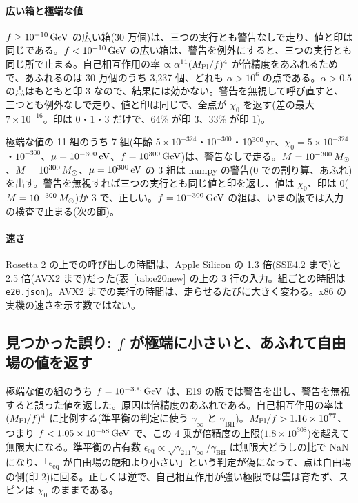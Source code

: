 \paragraph{広い箱と極端な値}
$f\ge10^{-10}\,\mathrm{GeV}$ の広い箱(30 万個)は、三つの実行とも警告なしで走り、値と印は同じである。$f<10^{-10}\,\mathrm{GeV}$ の広い箱は、警告を例外にすると、三つの実行とも同じ所で止まる。自己相互作用の率 $\propto\alpha^{11}(M_\mathrm{Pl}/f)^4$ が倍精度をあふれるためで、あふれるのは 30 万個のうち 3{,}237 個、どれも $\alpha>10^{6}$ の点である。$\alpha>0.5$ の点はもともと印 3 なので、結果には効かない。警告を無視して呼び直すと、三つとも例外なしで走り、値と印は同じで、全点が $\chi_0$ を返す(差の最大 $7\times10^{-16}$。印は 0・1・3 だけで、64\% が印 3、33\% が印 1)。

極端な値の 11 組のうち 7 組(年齢 $5\times10^{-324}$・$10^{-300}$・$10^{300}\,\mathrm{yr}$、$\chi_0=5\times10^{-324}$・$10^{-300}$、$\mu=10^{-300}\,\mathrm{eV}$、$f=10^{300}\,\mathrm{GeV}$)は、警告なしで走る。$M=10^{-300}\,M_\odot$、$M=10^{300}\,M_\odot$、$\mu=10^{300}\,\mathrm{eV}$ の 3 組は numpy の警告(0 での割り算、あふれ)を出す。警告を無視すれば三つの実行とも同じ値と印を返し、値は $\chi_0$、印は 0($M=10^{-300}\,M_\odot$)か 3 で、正しい。$f=10^{-300}\,\mathrm{GeV}$ の組は、いまの版では入力の検査で止まる(次の節)。

\paragraph{速さ}
Rosetta 2 の上での呼び出しの時間は、Apple Silicon の 1.3 倍(SSE4.2 まで)と 2.5 倍(AVX2 まで)だった(表~\ref{tab:e20new} の上の 3 行の入力。組ごとの時間は \texttt{e20.json})。AVX2 までの実行の時間は、走らせるたびに大きく変わる。x86 の実機の速さを示す数ではない。

\subsection{見つかった誤り: $f$ が極端に小さいと、あふれて自由場の値を返す}

極端な値の組のうち $f=10^{-300}\,\mathrm{GeV}$ は、E19 の版では警告を出し、警告を無視すると誤った値を返した。原因は倍精度のあふれである。自己相互作用の率は $(M_\mathrm{Pl}/f)^4$ に比例する(準平衡の判定に使う $\gamma_\infty$ と $\gamma_\mathrm{BH}$)。$M_\mathrm{Pl}/f>1.16\times10^{77}$、つまり $f<1.05\times10^{-58}\,\mathrm{GeV}$ で、この 4 乗が倍精度の上限($1.8\times10^{308}$)を越えて無限大になる。準平衡の占有数 $\epsilon_\mathrm{eq}\propto\sqrt{\gamma_{211}\gamma_\infty}/\gamma_\mathrm{BH}$ は無限大どうしの比で NaN になり、「$\epsilon_\mathrm{eq}$ が自由場の飽和より小さい」という判定が偽になって、点は自由場の側(印 2)に回る。正しくは逆で、自己相互作用が強い極限では雲は育たず、スピンは $\chi_0$ のままである。

